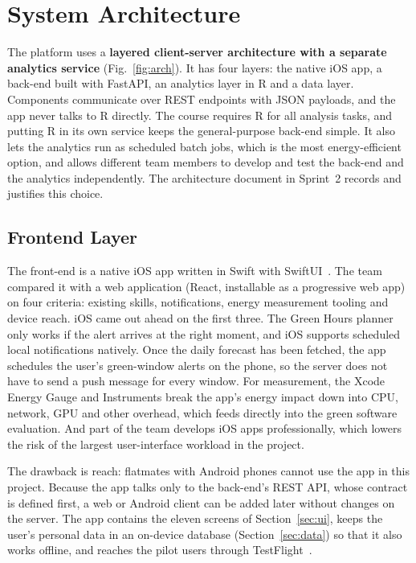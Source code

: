\documentclass[conference]{IEEEtran}
\begin{document}
\section{System Architecture}
The platform uses a \textbf{layered client-server architecture with a separate analytics service} (Fig.~\ref{fig:arch}). It has four layers: the native iOS app, a back-end built with FastAPI, an analytics layer in R and a data layer. Components communicate over REST endpoints with JSON payloads, and the app never talks to R directly. The course requires R for all analysis tasks, and putting R in its own service keeps the general-purpose back-end simple. It also lets the analytics run as scheduled batch jobs, which is the most energy-efficient option, and allows different team members to develop and test the back-end and the analytics independently. The architecture document in Sprint~2 records and justifies this choice.

\subsection{Frontend Layer}
\label{sec:frontend}
The front-end is a native iOS app written in Swift with SwiftUI~\cite{swiftui}. The team compared it with a web application (React, installable as a progressive web app) on four criteria: existing skills, notifications, energy measurement tooling and device reach. iOS came out ahead on the first three. The Green Hours planner only works if the alert arrives at the right moment, and iOS supports scheduled local notifications natively. Once the daily forecast has been fetched, the app schedules the user's green-window alerts on the phone, so the server does not have to send a push message for every window. For measurement, the Xcode Energy Gauge and Instruments break the app's energy impact down into CPU, network, GPU and other overhead, which feeds directly into the green software evaluation. And part of the team develops iOS apps professionally, which lowers the risk of the largest user-interface workload in the project.

The drawback is reach: flatmates with Android phones cannot use the app in this project. Because the app talks only to the back-end's REST API, whose contract is defined first, a web or Android client can be added later without changes on the server. The app contains the eleven screens of Section~\ref{sec:ui}, keeps the user's personal data in an on-device database (Section~\ref{sec:data}) so that it also works offline, and reaches the pilot users through TestFlight~\cite{testflight}.
\end{document}
